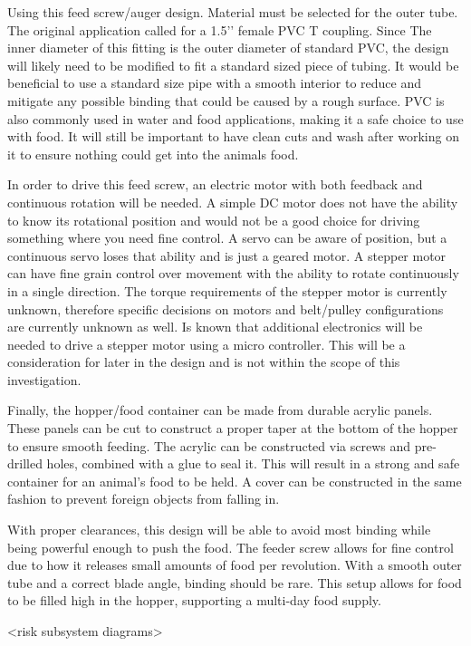 \documentclass[12pt]{article}
\begin{document}
Using this feed screw/auger design. Material must be selected for the outer tube. The original application called for a 1.5’’ female PVC T coupling. Since The inner diameter of this fitting is the outer diameter of standard PVC, the design will likely need to be modified to fit a standard sized piece of tubing. It would be beneficial to use a standard size pipe with a smooth interior to reduce and mitigate any possible binding that could be caused by a rough surface. PVC is also commonly used in water and food applications, making it a safe choice to use with food. It will still be important to have clean cuts and wash after working on it to ensure nothing could get into the animals food. 

In order to drive this feed screw, an electric motor with both feedback and continuous rotation will be needed. A simple DC motor does not have the ability to know its rotational position and would not be a good choice for driving something where you need fine control. A servo can be aware of position, but a continuous servo loses that ability and is just a geared motor. A stepper motor can have fine grain control over movement with the ability to rotate continuously in a single direction. The torque requirements of the stepper motor is currently unknown, therefore specific decisions on motors and belt/pulley configurations are currently unknown as well. Is known that additional electronics will be needed to drive a stepper motor using a micro controller. This will be a consideration for later in the design and is not within the scope of this investigation. 

Finally, the hopper/food container can be made from durable acrylic panels. These panels can be cut to construct a proper taper at the bottom of the hopper to ensure smooth feeding.  The acrylic can be constructed via screws and pre-drilled holes, combined with a glue to seal it. This will result in a strong and safe container for an animal’s food to be held. A cover can be constructed in the same fashion to prevent foreign objects from falling in. 

 With proper clearances, this design will be able to avoid most binding while being powerful enough to push the food. The feeder screw allows for fine control due to how it releases small amounts of food per revolution. With a smooth outer tube and a correct blade angle, binding should be rare. This setup allows for food to be filled high in the hopper, supporting a multi-day food supply. 

<risk subsystem diagrams>
\end{document}
